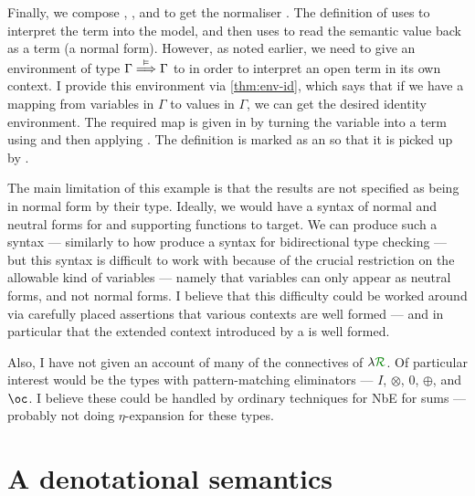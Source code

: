 Finally, we compose , , and
 to get the normaliser .
The definition of  uses  to interpret the
term into the model, and then uses  to read the semantic
value back as a term (a normal form).
However, as noted earlier, we need to give an environment of type
$\Gamma \stackrel{\vDash}\Longrightarrow \Gamma$ to  in order to interpret an open
term in its own context.
I provide this environment via \cref{thm:env-id}, which says that if we have a
mapping from variables in $\Gamma$ to values in $\Gamma$, we can get the desired
identity environment.
The required map is given in
by turning the variable into a term using  and
then applying .
The definition  is marked as
an  so that it is picked up by
.


The main limitation of this example is that the results are not specified as
being in normal form by their type.
Ideally, we would have a syntax of normal and neutral forms for
 and supporting functions to target.
We can produce such a syntax --- similarly to how \citet{AACMM21} produce a
syntax for bidirectional type checking --- but this syntax is difficult to work
with because of the crucial restriction on the allowable kind of variables ---
namely that variables can only appear as neutral forms, and not normal forms.
I believe that this difficulty could be worked around via carefully placed
assertions that various contexts are well formed --- and in particular that the
extended context introduced by a  is well formed.

Also, I have not given an account of many of the connectives of $\name$.
Of particular interest would be the types with pattern-matching eliminators ---
$I$, $\otimes$, $0$, $\oplus$, and $\oc$.
I believe these could be handled by ordinary techniques for NbE for sums ---
probably not doing $\eta$-expansion for these types.


\section{A denotational semantics}\label{sec:den-sem}

